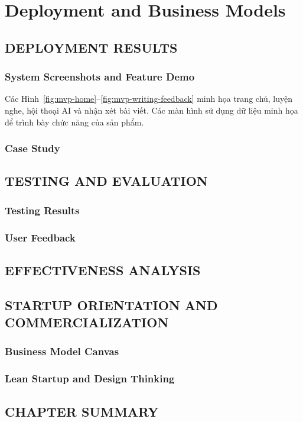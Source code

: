 \chapter{Deployment and Business Models}

\section{DEPLOYMENT RESULTS}
\subsection{System Screenshots and Feature Demo}
\label{sec:feature-demo}
Các Hình~\ref{fig:mvp-home}--\ref{fig:mvp-writing-feedback} minh họa trang chủ, luyện nghe, hội thoại AI và nhận xét bài viết. Các màn hình sử dụng dữ liệu minh họa để trình bày chức năng của sản phẩm.

\subsection{Case Study}
\section{TESTING AND EVALUATION}
\subsection{Testing Results}
\subsection{User Feedback}
\section{EFFECTIVENESS ANALYSIS}
\section{STARTUP ORIENTATION AND COMMERCIALIZATION}
\subsection{Business Model Canvas}
\subsection{Lean Startup and Design Thinking}
\section{CHAPTER SUMMARY}
